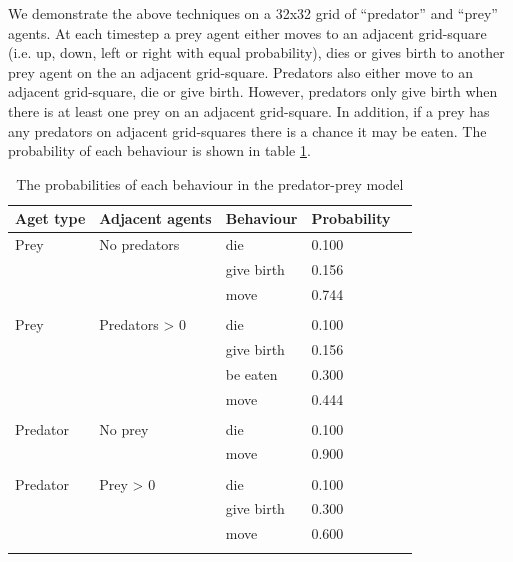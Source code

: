 \documentclass{article}
\begin{document}
We demonstrate the above techniques on a 32x32 grid of ``predator'' and ``prey'' agents. At each timestep a prey agent either moves to an adjacent grid-square (i.e. up, down, left or right with equal probability), dies or gives birth to another prey agent on the an adjacent grid-square. Predators also either move to an adjacent grid-square, die or give birth. However, predators only give birth when there is at least one prey on an adjacent grid-square. In addition, if a prey has any predators on adjacent grid-squares there is a chance it may be eaten. The probability of each behaviour is shown in table \ref{rates}.

\begin{table}
	\begin{center}
		\begin{tabular}{llllc}
		\hline
		Aget type & Adjacent agents & Behaviour & Probability\\
		\hline
		Prey & No predators & die &        0.100\\
			& & give birth &        0.156\\
			& & move &        0.744\\
			& &&\\
		Prey & Predators > 0 & die &        0.100\\
			& & give birth &        0.156\\
			& & be eaten &        0.300\\
			& & move &        0.444\\
			& &&\\
		Predator  & No prey & die  &      0.100\\
			& & move &        0.900\\
			& &&\\
		Predator  & Prey > 0 & die  &      0.100\\
			& & give birth &        0.300\\
			& & move &        0.600\\
		\hline& 
		\end{tabular}
	\end{center}
	\caption{The probabilities of each behaviour in the predator-prey model}
	\label{rates}
\end{table}
\end{document}
